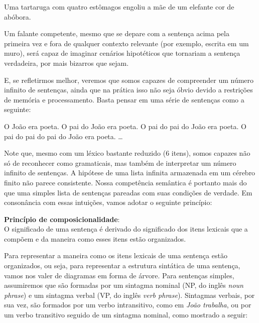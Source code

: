 \begin{exe}
    \ex Uma tartaruga com quatro estômagos engoliu a mãe de um elefante cor de
    abóbora. \label{wabaq}
\end{exe}

\n Um falante competente, mesmo que se depare com a sentença acima
pela primeira vez e fora de qualquer contexto relevante (por
exemplo, escrita em um muro), será capaz de imaginar cenários
hipotéticos que tornariam a sentença verdadeira, por mais bizarros
que sejam.


E, se refletirmos melhor, veremos que somos capazes de compreender
um número infinito de sen\-ten\-ças, ainda que na prática isso não
seja óbvio devido a restri\-çõ\-es de memória e processamento.
Basta pensar em uma série
de sen\-ten\-ças como a seguinte:

\begin{exe}
\ex \begin{xlist}
		\ex O João era poeta.
		\ex O pai do João era poeta.
		\ex O pai do pai do João era poeta.
		\ex O pai do pai do pai do João era poeta.
		\ex \ldots
	\end{xlist}
\end{exe}


\n Note que, mesmo com um léxico bastante reduzido (6 itens), somos
capazes não só de reconhecer como gramaticais, mas também de
interpretar um número infinito de sentenças. A hipótese de uma
lista infinita armazenada em um cérebro finito não parece
consistente. Nossa competência semântica é portanto mais do que
uma simples lista de sen\-ten\-ças pareadas com suas condi\-çõ\-es
de verdade. Em consonância com essas intui\-çõ\-es, vamos adotar o
seguinte prin\-cí\-pio:\\

\begin{tcolorbox}[boxrule=0pt,sharp corners]
	
\n\textbf{Princípio de composicionalidade}:\\
O significado de uma sentença é derivado do
significado dos itens lexicais que a compõem e da maneira como
esses itens estão organizados.

\end{tcolorbox}

\bigskip

\n Para representar a maneira como os itens lexicais de uma
sentença estão organizados, ou seja, para representar a estrutura
sintática de uma sentença, vamos nos valer de diagramas em forma
de árvore. Para sen\-ten\-ças simples, assumiremos que são
formadas por um sintagma nominal (NP, do inglês \textit{noun phrase}) e um sintagma verbal (VP, do inglês \textit{verb phrase}).
Sintagmas verbais, por sua vez, são formados por um verbo intransitivo, como em \textit{João trabalha}, ou por um
verbo transitivo seguido de um sintagma nominal, como mostrado a
seguir:\\

